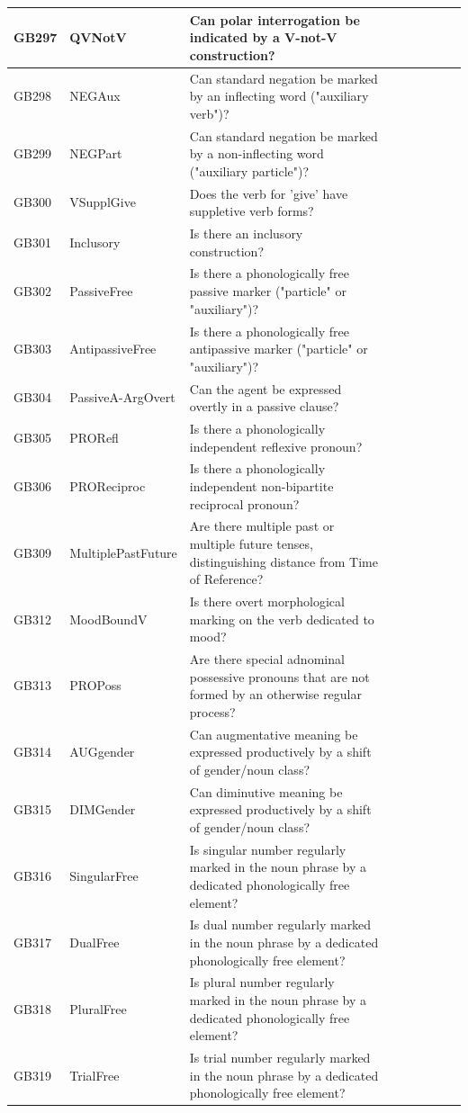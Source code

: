\documentclass[a4paper,10pt]{article} %
\begin{document}
\begin{landscape}
\begin{longtable}{| l | p{4cm}| p{12cm}|p{2cm}|p{2cm}|p{2cm}|p{2cm}|p{2cm}|p{2cm}|}
GB297 & QVNotV&Can polar interrogation be indicated by a V-not-V construction?\\ \hline
GB298 & NEGAux&Can standard negation be marked by an inflecting word ("auxiliary verb")?\\ \hline
GB299 & NEGPart&Can standard negation be marked by a non-inflecting word ("auxiliary particle")?\\ \hline
GB300 & VSupplGive&Does the verb for 'give' have suppletive verb forms?\\ \hline
GB301 & Inclusory&Is there an inclusory construction?\\ \hline
GB302 & PassiveFree&Is there a phonologically free passive marker ("particle" or "auxiliary")?\\ \hline
GB303 & AntipassiveFree&Is there a phonologically free antipassive marker ("particle" or "auxiliary")?\\ \hline
GB304 & PassiveA-ArgOvert&Can the agent be expressed overtly in a passive clause?\\ \hline
GB305 & PRORefl&Is there a phonologically independent reflexive pronoun?\\ \hline
GB306 & PROReciproc&Is there a phonologically independent non-bipartite reciprocal pronoun?\\ \hline
GB309 & MultiplePastFuture&Are there multiple past or multiple future tenses, distinguishing distance from Time of Reference?\\ \hline
GB312 & MoodBoundV&Is there overt morphological marking on the verb dedicated to mood?\\ \hline
GB313 & PROPoss&Are there special adnominal possessive pronouns that are not formed by an otherwise regular process?\\ \hline
GB314 & AUGgender&Can augmentative meaning be expressed productively by a shift of gender/noun class?\\ \hline
GB315 & DIMGender&Can diminutive meaning be expressed productively by a shift of gender/noun class?\\ \hline
GB316 & SingularFree&Is singular number regularly marked in the noun phrase by a dedicated phonologically free element?\\ \hline
GB317 & DualFree&Is dual number regularly marked in the noun phrase by a dedicated phonologically free element?\\ \hline
GB318 & PluralFree&Is plural number regularly marked in the noun phrase by a dedicated phonologically free element?\\ \hline
GB319 & TrialFree&Is trial number regularly marked in the noun phrase by a dedicated phonologically free element?\\ \hline

\end{longtable}
\end{landscape}
\end{document}
